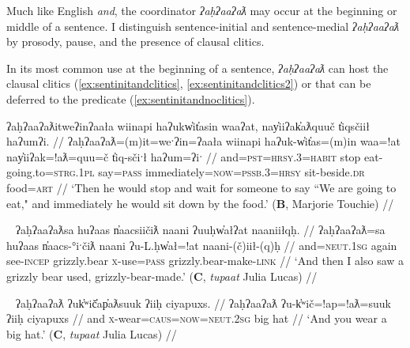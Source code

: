 Much like English \textit{and}, the coordinator \textit{ʔaḥʔaaʔaƛ} may occur at the beginning or middle of a sentence. I distinguish sentence-initial and sentence-medial \textit{ʔaḥʔaaʔaƛ} by prosody, pause, and the presence of clausal clitics.

In its most common use at the beginning of a sentence, \textit{ʔaḥʔaaʔaƛ} can host the clausal clitics (\ref{ex:sentinitandclitics}, \ref{ex:sentinitandclitics2}) or that can be deferred to the predicate (\ref{ex:sentinitandnoclitics}).

\begin{comment}
Context for (): Describing a picture-story.

ʔaanamtqač̓a ʔuusuqtack̓in.
And then he got hurt a little bit.

ʔaḥʔaaʔaƛƛa ƛakišiʔeƛƛa.
And then he stands back up.
BM
\end{comment}

\ex \label{ex:sentinitandclitics}
\begingl
\glpreamble ʔaḥʔaaʔaƛitweʔinʔaała wiinapi haʔukw̓it̓asin waaʔat, nay̓iiʔak̓aƛquuč t̓iqsčiił haʔumʔi. //
\gla ʔaḥʔaaʔaƛ=(m)it=weˑʔin=ʔaała wiinapi haʔuk-w̓it̓as=(m)in waa=!at nay̓iiʔak=!aƛ=quu=č t̓iq-sčiˑł haʔum=ʔiˑ //
\glb and=\textsc{pst}=\textsc{hrsy.3}=\textsc{habit} stop eat-going.to=\textsc{strg.1pl} say=\textsc{pass} immediately=\textsc{now}=\textsc{pssb.3}=\textsc{hrsy} sit-beside.\textsc{dr} food=\textsc{art} //
\glft `Then he would stop and wait for someone to say ``We are going to eat," and immediately he would sit down by the food.' (\textbf{B}, Marjorie Touchie) //
\endgl
\xe


\ex~ \label{ex:sentinitandclitics2}
\begingl
\glpreamble ʔaḥʔaaʔaƛsa huʔaas n̓aacsiičiƛ naani ʔuuḥw̓ałʔat naaniiłqḥ. //
\gla ʔaḥʔaaʔaƛ=sa huʔaas n̓aacs-°iˑčiƛ naani ʔu-L.ḥw̓ał=!at naani-(č)iił-(q)ḥ //
\glb and=\textsc{neut.1sg} again see-\textsc{incep} grizzly.bear \textsc{x}-use=\textsc{pass} grizzly.bear-make-\textsc{link} //
\glft `And then I also saw a grizzly bear used, grizzly-bear-made.' (\textbf{C}, \textit{tupaat} Julia Lucas) //
\endgl
\xe


\ex~ \label{ex:sentinitandnoclitics}
\begingl
\glpreamble ʔaḥʔaaʔaƛ ʔuk̓ʷič̓ap̓aƛsuuk ʔiiḥ ciyapuxs. //
\gla ʔaḥʔaaʔaƛ ʔu-k̓ʷič=!ap=!aƛ=suuk ʔiiḥ ciyapuxs //
\glb and \textsc{x}-wear=\textsc{caus}=\textsc{now}=\textsc{neut.2sg} big hat //
\glft `And you wear a big hat.' (\textbf{C}, \textit{tupaat} Julia Lucas) //
\endgl
\xe


